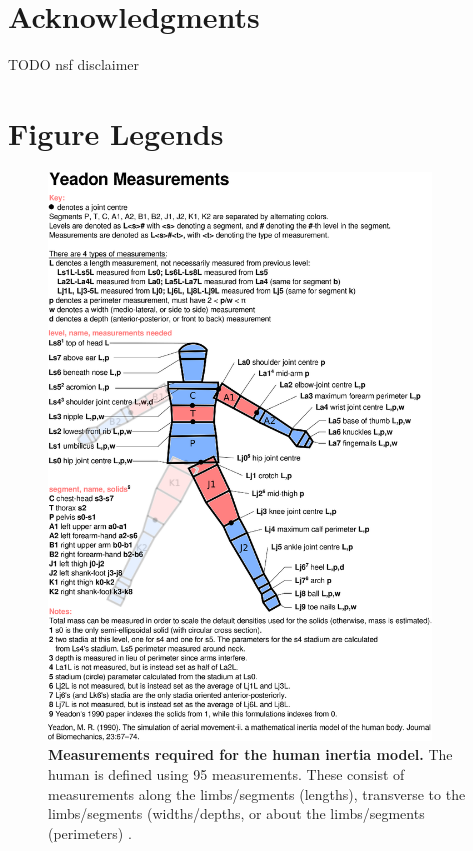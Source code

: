 \documentclass[10pt]{article}
\begin{document}

\section*{Acknowledgments}
TODO nsf disclaimer


\section*{Figure Legends}

\begin{figure}[!ht]
\begin{center}
\includegraphics[width=4in]{measurements.eps}
\end{center}
\caption{
{\bf Measurements required for the human inertia model.}  The human is defined
using 95 measurements. These consist of measurements along the limbs/segments
(lengths), transverse to the limbs/segments (widths/depths, or about the
limbs/segments (perimeters) \cite{Yeadon1990c}.
}
\label{fig:meas}
\end{figure}
\end{document}
